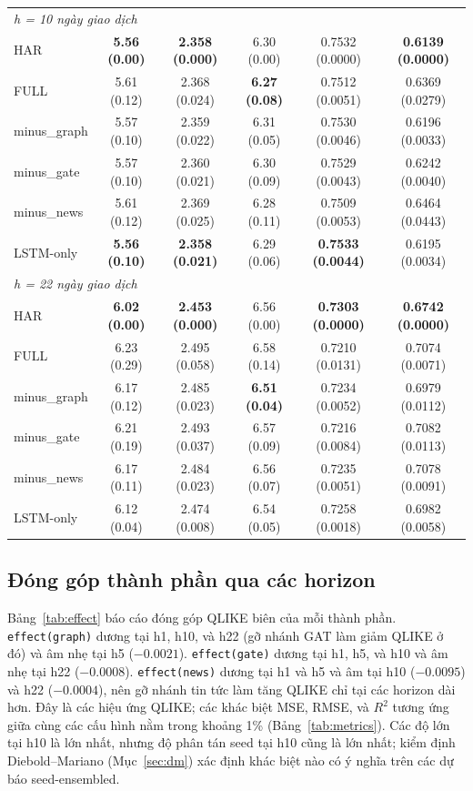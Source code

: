 \documentclass[runningheads]{llncs}
\begin{document}
\begin{table}[t]
\begin{tabular}{lccccc}
\midrule
\multicolumn{6}{l}{\textit{h = 10 ngày giao dịch}}\\
HAR         & \textbf{5.56 (0.00)} & \textbf{2.358 (0.000)} & 6.30 (0.00) & 0.7532 (0.0000) & \textbf{0.6139 (0.0000)} \\
FULL        & 5.61 (0.12) & 2.368 (0.024) & \textbf{6.27 (0.08)} & 0.7512 (0.0051) & 0.6369 (0.0279) \\
minus\_graph & 5.57 (0.10) & 2.359 (0.022) & 6.31 (0.05) & 0.7530 (0.0046) & 0.6196 (0.0033) \\
minus\_gate  & 5.57 (0.10) & 2.360 (0.021) & 6.30 (0.09) & 0.7529 (0.0043) & 0.6242 (0.0040) \\
minus\_news  & 5.61 (0.12) & 2.369 (0.025) & 6.28 (0.11) & 0.7509 (0.0053) & 0.6464 (0.0443) \\
LSTM-only   & \textbf{5.56 (0.10)} & \textbf{2.358 (0.021)} & 6.29 (0.06) & \textbf{0.7533 (0.0044)} & 0.6195 (0.0034) \\
\midrule
\multicolumn{6}{l}{\textit{h = 22 ngày giao dịch}}\\
HAR         & \textbf{6.02 (0.00)} & \textbf{2.453 (0.000)} & 6.56 (0.00) & \textbf{0.7303 (0.0000)} & \textbf{0.6742 (0.0000)} \\
FULL        & 6.23 (0.29) & 2.495 (0.058) & 6.58 (0.14) & 0.7210 (0.0131) & 0.7074 (0.0071) \\
minus\_graph & 6.17 (0.12) & 2.485 (0.023) & \textbf{6.51 (0.04)} & 0.7234 (0.0052) & 0.6979 (0.0112) \\
minus\_gate  & 6.21 (0.19) & 2.493 (0.037) & 6.57 (0.09) & 0.7216 (0.0084) & 0.7082 (0.0113) \\
minus\_news  & 6.17 (0.11) & 2.484 (0.023) & 6.56 (0.07) & 0.7235 (0.0051) & 0.7078 (0.0091) \\
LSTM-only   & 6.12 (0.04) & 2.474 (0.008) & 6.54 (0.05) & 0.7258 (0.0018) & 0.6982 (0.0058) \\
\bottomrule
\end{tabular}
\end{table}

\subsection{Đóng góp thành phần qua các horizon}
\label{sec:components}
Bảng~\ref{tab:effect} báo cáo đóng góp QLIKE biên của mỗi thành phần. \texttt{effect(graph)} dương tại
h1, h10, và h22 (gỡ nhánh GAT làm giảm QLIKE ở đó) và âm nhẹ tại h5 ($-0.0021$). \texttt{effect(gate)}
dương tại h1, h5, và h10 và âm nhẹ tại h22 ($-0.0008$). \texttt{effect(news)} dương tại h1 và h5 và âm
tại h10 ($-0.0095$) và h22 ($-0.0004$), nên gỡ nhánh tin tức làm tăng QLIKE chỉ tại các horizon dài hơn.
Đây là các hiệu ứng QLIKE; các khác biệt MSE, RMSE, và $R^2$ tương ứng giữa cùng các cấu hình nằm trong
khoảng 1\% (Bảng~\ref{tab:metrics}). Các độ lớn tại h10 là lớn nhất, nhưng độ phân tán seed tại h10 cũng
là lớn nhất; kiểm định Diebold--Mariano (Mục~\ref{sec:dm}) xác định khác biệt nào có ý nghĩa trên các dự
báo seed-ensembled.
\end{document}
